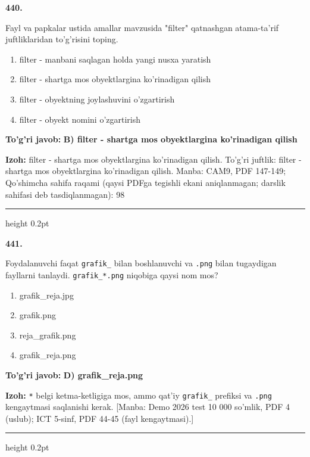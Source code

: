 \documentclass[10pt,a4paper]{article}
\begin{document}
{\bfseries\sffamily\color{ink} 440.}
\par
Fayl va papkalar ustida amallar mavzusida "filter" qatnashgan atama-ta'rif juftliklaridan to'g'risini toping.
\begin{enumerate}[label=\Alph*),leftmargin=9mm]
\item filter - manbani saqlagan holda yangi nusxa yaratish
\item filter - shartga mos obyektlargina ko'rinadigan qilish
\item filter - obyektning joylashuvini o'zgartirish
\item filter - obyekt nomini o'zgartirish
\end{enumerate}
\begin{tcolorbox}[enhanced,breakable,colback=teal!4,colframe=teal!60!black,boxrule=0.45pt,arc=1.2mm,left=2.7mm,right=2.7mm,top=1.8mm,bottom=1.8mm,before skip=2mm,after skip=2mm]
{\bfseries\sffamily\color{teal}To'g'ri javob:} \textbf{B) filter - shartga mos obyektlargina ko'rinadigan qilish}
\par\smallskip
{\bfseries Izoh:} filter - shartga mos obyektlargina ko'rinadigan qilish. To'g'ri juftlik: filter - shartga mos obyektlargina ko'rinadigan qilish. Manba: CAM9, PDF 147-149; Qo'shimcha sahifa raqami (qaysi PDFga tegishli ekani aniqlanmagan; darslik sahifasi deb tasdiqlanmagan): 98
\end{tcolorbox}
\vspace{2mm}\hrule height 0.2pt\vspace{3mm}

{\bfseries\sffamily\color{ink} 441.}
\par
Foydalanuvchi faqat \texttt{grafik\_} bilan boshlanuvchi va \texttt{.png} bilan tugaydigan fayllarni tanlaydi. \texttt{grafik\_*.png} niqobiga qaysi nom mos?
\begin{enumerate}[label=\Alph*),leftmargin=9mm]
\item grafik\_reja.jpg
\item grafik.png
\item reja\_grafik.png
\item grafik\_reja.png
\end{enumerate}
\begin{tcolorbox}[enhanced,breakable,colback=teal!4,colframe=teal!60!black,boxrule=0.45pt,arc=1.2mm,left=2.7mm,right=2.7mm,top=1.8mm,bottom=1.8mm,before skip=2mm,after skip=2mm]
{\bfseries\sffamily\color{teal}To'g'ri javob:} \textbf{D) grafik\_reja.png}
\par\smallskip
{\bfseries Izoh:} \texttt{*} belgi ketma-ketligiga mos, ammo qat'iy \texttt{grafik\_} prefiksi va \texttt{.png} kengaytmasi saqlanishi kerak. [Manba: Demo 2026 test 10 000 so'mlik, PDF 4 (uslub); ICT 5-sinf, PDF 44-45 (fayl kengaytmasi).]
\end{tcolorbox}
\vspace{2mm}\hrule height 0.2pt\vspace{3mm}
\end{document}
